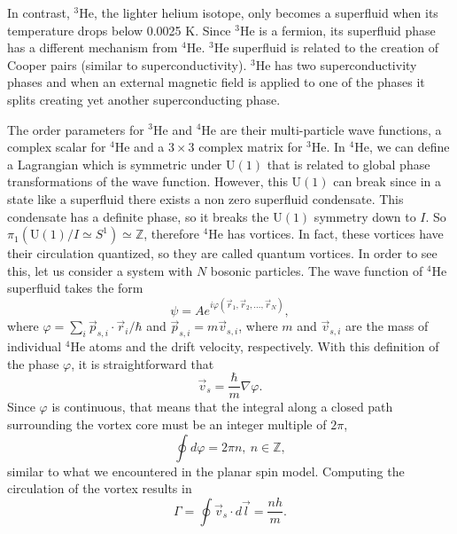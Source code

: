 In contrast, $^3$He, the lighter helium isotope, only becomes a superfluid when its temperature drops below 0.0025 K. Since $^3$He is a fermion, its superfluid phase has a different mechanism from $^4$He. $^3$He superfluid is related to the creation of Cooper pairs (similar to superconductivity). $^3$He has two superconductivity phases and when an external magnetic field is applied to one of the phases it splits creating yet another superconducting phase.

The order parameters for $^3$He and $^4$He are their multi-particle wave functions, a complex scalar for $^4$He and a $3\times 3$ complex matrix for $^3$He. In $^4$He, we can define a Lagrangian which is symmetric under $\text{U}(1)$ that is related to global phase transformations of the wave function. However, this $\text{U}(1)$ can break since in a state like a superfluid there exists a non zero superfluid condensate. This condensate has a definite phase, so it breaks the $\text{U}(1)$ symmetry down to $I$. %
 So $\pi_1(\text{U}(1)/I\simeq S^1) \simeq \mathbb{Z}$, therefore $^4$He has vortices. In fact, these vortices have their circulation quantized, so they are called quantum vortices. In order to see this, let us consider a system with $N$ bosonic particles. The wave function of $^4$He superfluid takes the form
\begin{equation}
	\psi = A e^{i\varphi(\vec{r}_1,\vec{r}_2,\dots,\vec{r}_N)},
\end{equation}
where $\varphi = \sum_i \vec{p}_{s,i}\cdot\vec{r}_i/\hbar$ and $\vec{p}_{s,i}= m \vec{v}_{s,i}$, where $m$ and $\vec{v}_{s,i}$ are the mass of  individual $^4$He atoms and the drift velocity, respectively. With this definition of the phase $\varphi$, it is straightforward that
\begin{equation}
	\vec{v}_s = \frac{\hbar}{m}\nabla \varphi.
\end{equation}
Since $\varphi$ is continuous, that means that the integral along a closed path surrounding the vortex core must be an integer multiple of $2\pi$,
\begin{equation}
	\oint d \varphi = 2\pi n, \ n\in\mathbb{Z},
\end{equation}
similar to what we encountered in the planar spin model. Computing the circulation of the vortex results in
\begin{equation}
	\Gamma = \oint \vec{v}_s \cdot d\vec{l} = \frac{nh}{m}.
\end{equation}

